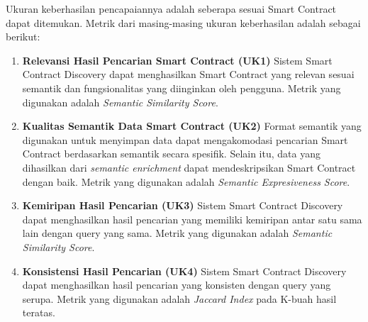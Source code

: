 
Ukuran keberhasilan pencapaiannya adalah seberapa sesuai Smart Contract dapat ditemukan. Metrik dari masing-masing ukuran keberhasilan adalah sebagai berikut:

\begin{enumerate}
  \item \textbf{Relevansi Hasil Pencarian Smart Contract (UK1)} \newline 
  Sistem Smart Contract Discovery dapat menghasilkan Smart Contract yang relevan sesuai semantik dan fungsionalitas yang diinginkan oleh pengguna. Metrik yang digunakan adalah \textit{Semantic Similarity Score}. 

  \item \textbf{Kualitas Semantik Data Smart Contract (UK2)} \newline
  Format semantik yang digunakan untuk menyimpan data dapat mengakomodasi pencarian Smart Contract berdasarkan semantik secara spesifik. Selain itu, data yang dihasilkan dari \textit{semantic enrichment} dapat mendeskripsikan Smart Contract dengan baik. Metrik yang digunakan adalah \textit{Semantic Expresiveness Score}.

  \item \textbf{Kemiripan Hasil Pencarian (UK3)} \newline
  Sistem Smart Contract Discovery dapat menghasilkan hasil pencarian yang memiliki kemiripan antar satu sama lain dengan query yang sama. Metrik yang digunakan adalah \textit{Semantic Similarity Score}.

  \item \textbf{Konsistensi Hasil Pencarian (UK4)} \newline
  Sistem Smart Contract Discovery dapat menghasilkan hasil pencarian yang konsisten dengan query yang serupa. Metrik yang digunakan adalah \textit{Jaccard Index} pada K-buah hasil teratas.
  

\end{enumerate}
